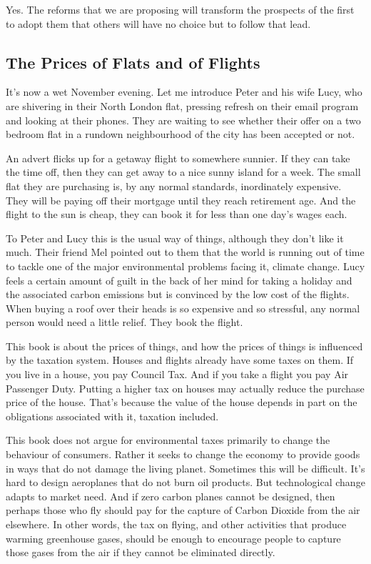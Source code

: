 \documentclass[]{tufte-handout}
\begin{document}
Yes. The reforms that we are proposing will transform the prospects of
the first to adopt them that others will have no choice but to follow
that lead.

\hypertarget{the-prices-of-flats-and-of-flights}{%
\subsection{The Prices of Flats and of
Flights}\label{the-prices-of-flats-and-of-flights}}

It's now a wet November evening. Let me introduce Peter and his wife
Lucy, who are shivering in their North London flat, pressing refresh on
their email program and looking at their phones. They are waiting to see
whether their offer on a two bedroom flat in a rundown neighbourhood of
the city has been accepted or not.

An advert flicks up for a getaway flight to somewhere sunnier. If they
can take the time off, then they can get away to a nice sunny island for
a week. The small flat they are purchasing is, by any normal standards,
inordinately expensive. They will be paying off their mortgage until
they reach retirement age. And the flight to the sun is cheap, they can
book it for less than one day's wages each.

To Peter and Lucy this is the usual way of things, although they don't
like it much. Their friend Mel pointed out to them that the world is
running out of time to tackle one of the major environmental problems
facing it, climate change. Lucy feels a certain amount of guilt in the
back of her mind for taking a holiday and the associated carbon
emissions but is convinced by the low cost of the flights. When buying a
roof over their heads is so expensive and so stressful, any normal
person would need a little relief. They book the flight.

This book is about the prices of things, and how the prices of things is
influenced by the taxation system. Houses and flights already have some
taxes on them. If you live in a house, you pay Council Tax. And if you
take a flight you pay Air Passenger Duty. Putting a higher tax on houses
may actually reduce the purchase price of the house. That's because the
value of the house depends in part on the obligations associated with
it, taxation included.

This book does not argue for environmental taxes primarily to change the
behaviour of consumers. Rather it seeks to change the economy to provide
goods in ways that do not damage the living planet. Sometimes this will
be difficult. It's hard to design aeroplanes that do not burn oil
products. But technological change adapts to market need. And if zero
carbon planes cannot be designed, then perhaps those who fly should pay
for the capture of Carbon Dioxide from the air elsewhere. In other
words, the tax on flying, and other activities that produce warming
greenhouse gases, should be enough to encourage people to capture those
gases from the air if they cannot be eliminated directly.
\end{document}
